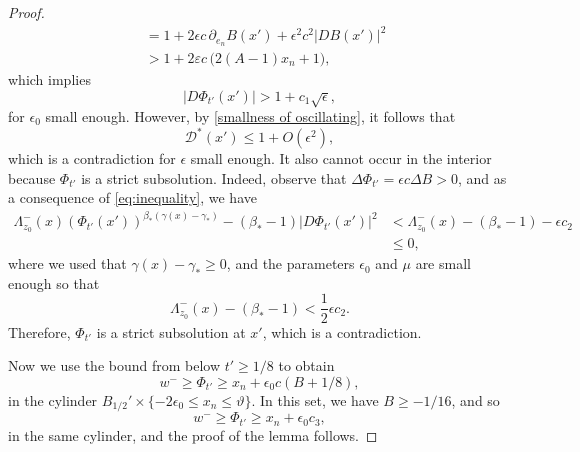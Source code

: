 \documentclass[reqno,11pt]{amsart}
\newcommand{\1}{\mathds{1}}
\numberwithin{equation}{section}
\begin{document}
\begin{proof}
\begin{align}
  &= 1 + 2\epsilon c\, \partial_{e_n} B(x') + \epsilon^2 c^2 |D B(x')|^2 \\
  &> 1 + 2\varepsilon c\,\bigl(2(A-1)x_n + 1\bigr), \label{eq:inequality}
\end{align}
which implies
$$
    |D\Phi_{t'}(x')| > 1 + c_1\sqrt{\epsilon},
$$
for $\epsilon_0$ small enough. However, by \ref{smallness of oscillating}, it follows that
$$
   \mathcal{D}^\ast(x') \leq 1 + O(\epsilon^2), 
$$
which is a contradiction for $\epsilon$ small enough. It also cannot occur in the interior because $\Phi_{t'}$ is a strict subsolution. Indeed, observe that $\Delta \Phi_{t'} = \epsilon c \Delta B > 0$, and as a consequence of \eqref{eq:inequality}, we have
\begin{align*}
   \Lambda^-_{z_0}(x)\left(\Phi_{t'}(x')\right)^{\beta_\ast(\gamma(x)-\gamma_\ast)} - (\beta_\ast - 1)|D\Phi_{t'}(x')|^2 & <   \Lambda^-_{z_0}(x) - (\beta_\ast - 1) - \epsilon c_2\\
   & \leq  0,
\end{align*}
where we used that $\gamma(x)-\gamma_\ast \geq 0$, and the parameters $\epsilon_0$ and $\mu$ are small enough so that 
$$
\Lambda^-_{z_0}(x) - (\beta_\ast - 1) < \frac{1}{2}\epsilon c_2.
$$
Therefore, $\Phi_{t'}$ is a strict subsolution at $x'$, which is a contradiction.

Now we use the bound from below $t' \geq 1/8$ to obtain
$$
    w^- \geq \Phi_{t'} \geq x_n + \epsilon_0 c(B + 1/8),
$$
in the cylinder $B_{1/2}' \times \{-2\epsilon_0 \leq x_n \leq \vartheta\}$. In this set, we have $B \geq -1/16$, and so 
$$
    w^- \geq \Phi_{t'} \geq x_n + \epsilon_0 c_3,
$$
in the same cylinder, and the proof of the lemma follows. 


\end{proof}
\end{document}
